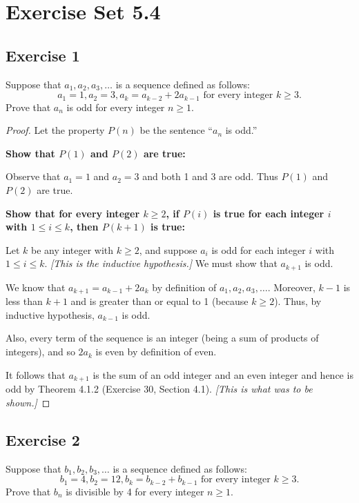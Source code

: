 \documentclass[14pt]{extarticle}
\begin{document}
\section{Exercise Set 5.4}

\subsection{Exercise 1}
Suppose that $a_1, a_2, a_3, \ldots$ is a sequence defined
as follows:
\[
a_1 = 1, a_2 = 3, a_k = a_{k-2} + 2a_{k-1} \text{ for every integer $k \geq 3$.}
\]
Prove that $a_n$ is odd for every integer $n \geq 1$.

\begin{proof}
Let the property $P(n)$ be the sentence “$a_n$ is odd.”

{\bf Show that $P(1)$ and $P(2)$ are true:}

Observe that $a_1 = 1$ and $a_2 = 3$ and both 1 and 3 are odd. Thus $P(1)$ and $P(2)$ are true.

{\bf Show that for every integer $k \geq 2$, if $P(i)$ is true for each integer $i$ with $1 \leq i \leq k$, then $P(k + 1)$ is true:}

Let $k$ be any integer with $k \geq 2$, and suppose $a_i$ is odd for each integer $i$ with $1 \leq i \leq k$. {\it [This is the inductive hypothesis.]} We must show that $a_{k+1}$ is odd. 

We know that $a_{k+1} = a_{k-1} + 2a_k$ by definition of $a_1, a_2, a_3, \ldots$. Moreover, $k - 1$ is less than $k + 1$ and is greater than or equal to 1 (because $k \geq 2$). Thus, by inductive hypothesis, $a_{k-1}$ is odd. 

Also, every term of the sequence is an integer (being a sum of products of integers), and so $2a_k$ is even by definition of even. 

It follows that $a_{k+1}$ is the sum of an odd integer and an even integer and hence is odd by Theorem 4.1.2 (Exercise 30, Section 4.1). {\it [This is what was to be shown.]}
\end{proof}

\subsection{Exercise 2}
Suppose that $b_1, b_2, b_3, \ldots$ is a sequence defined
as follows:
\[
b_1 = 4, b_2 = 12, b_k = b_{k-2} + b_{k-1} \text{ for every integer $k \geq 3$.}
\]
Prove that $b_n$ is divisible by 4 for every integer $n \geq 1$.
\end{document}
